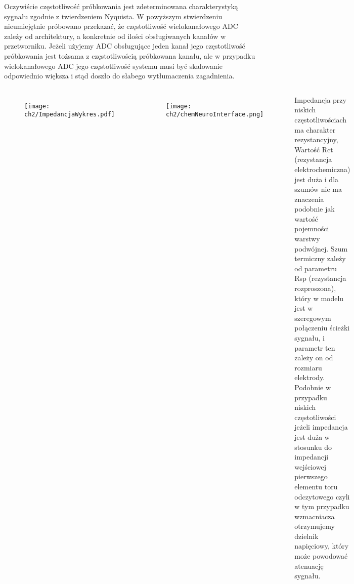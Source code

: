 \begin{frame}[t]
    \begin{block}{\dk}
    \end{block}
    Oczywiście częstotliwość próbkowania jest zdeterminowana charakterystyką sygnału zgodnie z twierdzeniem Nyquista.
    W powyższym stwierdzeniu nieumiejętnie próbowano przekazać, że częstotliwość wielokanałowego ADC zależy od architektury, a konkretnie od ilości obsługiwanych kanałów w przetworniku.
    Jeżeli użyjemy ADC obsługujące jeden kanał jego częstotliwość próbkowania jest tożsama z częstotliwością próbkowana kanału, ale w przypadku wielokanałowego ADC jego częstotliwość systemu musi być skalowanie odpowiednio większa i stąd doszło do słabego wytłumaczenia zagadnienia.
 
\end{frame}

\begin{frame}[t]
    \begin{block}{\dk}
    \end{block}

    \begin{columns}

        \vspace{-1em}
        \begin{figure}[H]
            \texttt{[image: ch2/ImpedancjaWykres.pdf]}
        \end{figure}
        \vspace{-1em}
        \begin{figure}[H]
            \texttt{[image: ch2/chemNeuroInterface.png]}
        \end{figure}
    
        Impedancja przy niskich częstotliwościach ma charakter rezystancyjny, Wartość Rct (rezystancja elektrochemiczna) jest duża i dla szumów nie ma znaczenia podobnie jak wartość pojemności warstwy podwójnej.  Szum termiczny zależy od parametru Rsp (rezystancja rozproszona), który w modelu jest w szeregowym połączeniu ścieżki sygnału, i parametr ten zależy on od rozmiaru elektrody.
        Podobnie w przypadku niskich częstotliwości jeżeli impedancja jest duża w stosunku do impedancji wejściowej pierwszego elementu toru odczytowego czyli w tym przypadku wzmacniacza otrzymujemy dzielnik napięciowy, który może powodować atenuację sygnału. 
        
    \end{columns}
\end{frame}

